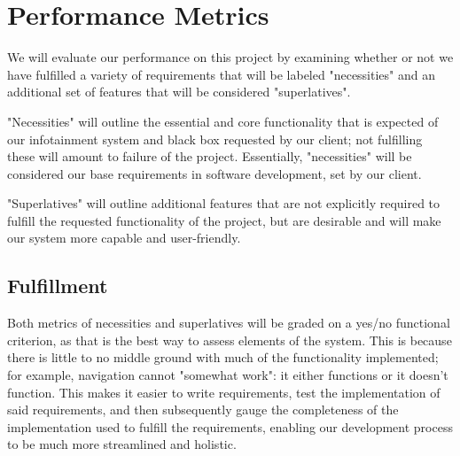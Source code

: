 \documentclass[onecolumn, draftclsnofoot,10pt, compsoc]{IEEEtran}
\begin{document}
\section{Performance Metrics}
We will evaluate our performance on this project by examining whether or not we have fulfilled a variety of requirements that will be labeled "necessities" and an additional set of  features that will be considered "superlatives".\par
"Necessities" will outline the essential and core functionality that is expected of our infotainment system and black box requested by our client; not fulfilling these will amount to failure of the project. Essentially, "necessities" will be considered our base requirements in software development, set by our client.\par
"Superlatives" will outline additional features that are not explicitly required to fulfill the requested functionality of the project, but are desirable and will make our system more capable and user-friendly.\par

\subsection{Fulfillment}
Both metrics of necessities and superlatives will be graded on a yes/no functional criterion, as that is the best way to assess elements of the system. This is because there is little to no middle ground with much of the functionality implemented; for example, navigation cannot "somewhat work": it either functions or it doesn't function. This makes it easier to write requirements, test the implementation of said requirements, and then subsequently gauge the completeness of the  implementation used to fulfill the requirements, enabling our development process to be much more streamlined and holistic.\par
\end{document}
